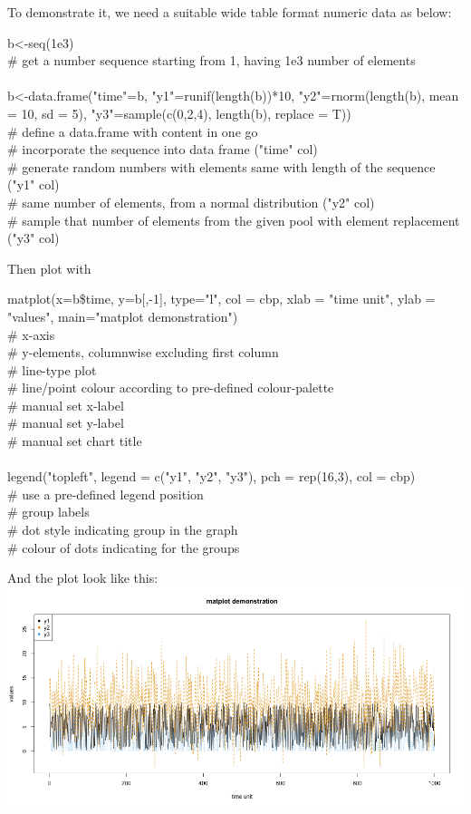 \documentclass[../note.tex]{subfiles} %
\begin{document}
To demonstrate it, we need a suitable wide table format numeric data as below:
\begin{code}
b<-seq(1e3)\\
\# get a number sequence starting from 1, having 1e3 number of elements\\\\
b<-data.frame("time"=b, "y1"=runif(length(b))*10, "y2"=rnorm(length(b), mean = 10, sd = 5), "y3"=sample(c(0,2,4), length(b), replace = T))\\
\# define a data.frame with content in one go\\
\# incorporate the sequence into data frame ("time" col)\\
\# generate random numbers with elements same with length of the sequence ("y1" col)\\
\# same number of elements, from a normal distribution ("y2" col)\\
\# sample that number of elements from the given pool with element replacement ("y3" col)
\end{code}
Then plot with
\begin{code}
matplot(x=b\$time, y=b[,-1], type="l", col = cbp, xlab = "time unit", ylab = "values", main="matplot demonstration")\\
\# x-axis\\
\# y-elements, columnwise excluding first column\\
\# line-type plot\\
\# line/point colour according to pre-defined colour-palette\\
\# manual set x-label\\
\# manual set y-label\\
\# manual set chart title\\\\

legend("topleft", legend = c("y1", "y2", "y3"), pch = rep(16,3), col = cbp)\\
\# use a pre-defined legend position\\
\# group labels\\
\# dot style indicating group in the graph\\
\# colour of dots indicating for the groups
\end{code}
And the plot look like this:\\
\includegraphics[width=.9\linewidth]{../graph/matplot.png}
\end{document}
